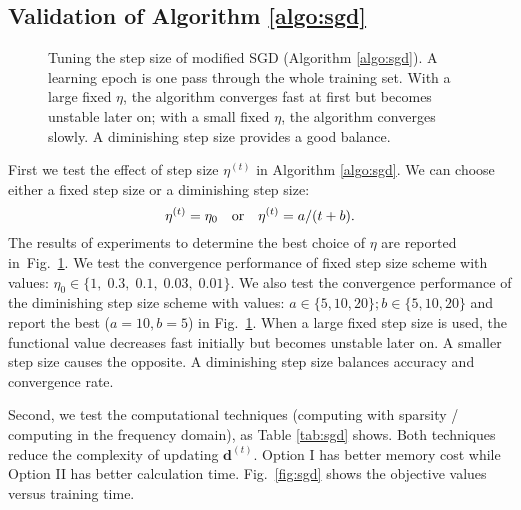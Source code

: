 \documentclass[final]{siamart1116}
\newcommand{\fig}[1]{Fig.~\ref{fig:#1}}
\newcommand{\mb}[1]{\mathbf{#1}}
\begin{document}
\subsection{Validation of Algorithm \ref{algo:sgd}}\label{sec:sgd_rslt}

\begin{figure}[t]
\centering \small

\caption{Tuning the step size of modified SGD (Algorithm \ref{algo:sgd}). A learning epoch is one pass through the whole training set.  With a large fixed $\eta$, the algorithm converges fast at first but becomes unstable later on; with a small fixed $\eta$, the algorithm converges slowly. A diminishing step size provides a good balance.}
\label{fig:sgd_all}
\end{figure}

First we test the effect of step size $\eta^{(t)}$ in Algorithm \ref{algo:sgd}. We can choose either a fixed step size or a diminishing step size:
\vspace{-2mm}
\[
\eta^{(t)} = \eta_0  \quad \text{or} \quad \eta^{(t)}=a/(t+b).
\vspace{-1mm}
\]
The results of experiments to determine the best choice of $\eta$ are reported in~\fig{sgd_all}.  We test the convergence performance of fixed step size scheme with values: $\eta_0 \in \{1,\; 0.3,\; 0.1,\; 0.03,\; 0.01\}$. We also test the convergence performance of the diminishing step size scheme with values: $ a \in \{ 5, 10, 20\}; b \in \{5, 10, 20\}$ and report the best ($a=10,b=5$) in \fig{sgd_all}. When a large fixed step size is used, the functional value decreases fast initially but becomes unstable later on. A smaller step size causes the opposite. A diminishing step size balances accuracy and convergence rate.

Second, we test the computational techniques (computing with sparsity / computing in the frequency domain), as Table \ref{tab:sgd} shows. Both techniques reduce the complexity of updating $\mb{d}^{(t)}$.  Option I has better memory cost while Option II has better calculation time. \fig{sgd} shows the objective values versus training time.
\end{document}
